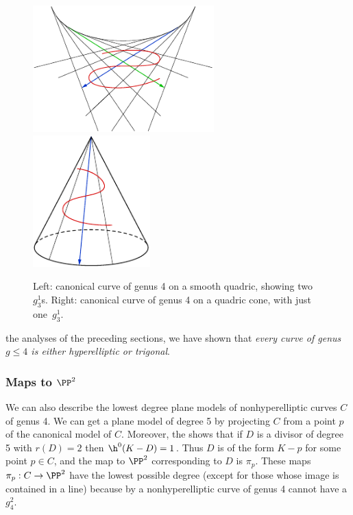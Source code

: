 \begin{figure}
\centerline{\hbox{\includegraphics[height=1.93in]{main/Fig08-1}}\hfil
\includegraphics[height=2in]{main/Fig08-2}\quad}
\caption{Left: canonical curve of genus 4 on a smooth quadric, showing
  two $g^{1}_3$s.  Right: canonical curve of genus 4 on a quadric
  cone, with just one~$g^{1}_{3}$.}
\label{Fig8.1}
\end{figure}

the analyses of the preceding sections, we have shown that
%
\emph{every curve of genus $g \leq 4$ is either hyperelliptic or trigonal}.

\subsubsection*{Maps to $\PP^2$}

We can also describe the lowest degree plane models of nonhyperelliptic curves $C$ of genus 4.
We can get a plane model of degree 5 by projecting $C$ from a point $p$ of the canonical model of $C$.
Moreover, the
%
shows that if $D$ is a divisor of
degree 5 with $r(D)=2$ then
$\h^0(K-D) = 1$. Thus $D$ is of the form
$K-p$ for some point $p \in C$, and the map to $\PP^2$ corresponding
to $D$ is $\pi_p$. These  maps $\pi_p: C\to \PP^2$ have the lowest
possible degree (except for those whose image is  contained in a line)
because by
%
a nonhyperelliptic curve of genus 4
cannot have a $g^2_4$.

